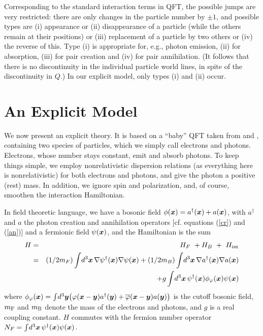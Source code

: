 \documentclass[12pt]{article}
\begin{document}
Corresponding to the standard interaction terms in QFT, the possible jumps
are very restricted: there are only changes in the particle number by $\pm 1$,
and possible types are (i) appearance or (ii) disappearance of a particle
(while the others remain at their positions) or (iii) replacement of a
particle by two others or (iv) the reverse of this. Type (i) is
appropriate for, e.g., photon emission, (ii) for absorption, (iii) for pair
creation and (iv) for pair annihilation. (It follows that there is no
discontinuity in the individual particle world lines, in spite of the
discontinuity in $Q$.)  In our explicit model, only types (i) and (ii)
occur.


\section{An Explicit Model}

We now present an explicit theory. It is based on a ``baby'' QFT taken
from \cite[p.~339]{Schweber} and \cite{Nelson}, containing two species
of particles, which we simply call electrons and photons. Electrons,
whose number stays constant, emit and absorb photons. To keep things
simple, we employ nonrelativistic dispersion relations (as everything
here is nonrelativistic) for both electrons and photons, and give the
photon a positive (rest) mass. In addition, we ignore spin and
polarization, and, of course, smoothen the interaction Hamiltonian.

In field theoretic language, we have a bosonic field $\phi(\boldsymbol{x}) =
a^{\dag}(\boldsymbol{x}) + a(\boldsymbol{x})$, with $a^{\dag}$ and $a$ the photon creation
and annihilation operators [cf. equations (\ref{cr}) and (\ref{an})]
and a fermionic field $\psi(\boldsymbol{x})$, and the Hamiltonian is the sum
\begin{eqnarray}\nonumber
  H&=&H_{F}\ + H_{B}\ +\ H_{\mathrm{int}} \\\nonumber
  &=&(1/2m_F) \int\!d^3\boldsymbol{x}\,\nabla \psi^{\dag}(\boldsymbol{x})\nabla \psi(\boldsymbol{x})
  +(1/2m_B) \int\!d^3\boldsymbol{x}\,\nabla a^{\dag}(\boldsymbol{x})\nabla a(\boldsymbol{x})\\\nonumber 
  &\quad&\qquad + g\int \!d^3\boldsymbol{x}\, \psi^{\dag}(\boldsymbol{x}) \phi_{\varphi}
  (\boldsymbol{x}) \psi(\boldsymbol{x})
\end{eqnarray}
where $\phi_{\varphi}(\boldsymbol{x})= \int\!d^3\boldsymbol y\big(\varphi(\boldsymbol{x}-\boldsymbol y)
a^{\dag}(\boldsymbol y) + \overline{\varphi}(\boldsymbol{x}-\boldsymbol y)a(\boldsymbol y)\big)$ is the cutoff
bosonic field, $m_{\mathrm{F}}$ and $m_{\mathrm{B}}$ denote the mass of the electrons
and photons, and $g$ is a real coupling constant.  $H$ commutes with
the fermion number operator $N_F =\int\!d^3\boldsymbol{x}\,
\psi^{\dag}(\boldsymbol{x})\psi(\boldsymbol{x})$.
\end{document}
